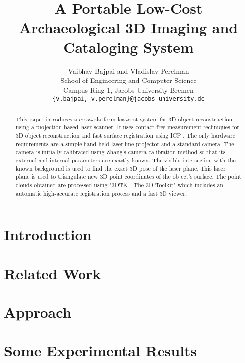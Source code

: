 \documentclass[conference]{IEEEtran}
\begin{document}
\title{A Portable Low-Cost Archaeological 3D Imaging and Cataloging System}

\author{
  Vaibhav Bajpai and Vladislav Perelman \\
  School of Engineering and Computer Science\\
  Campus Ring 1, Jacobs University Bremen\\
  \texttt{\{v.bajpai, v.perelman\}@jacobs-university.de}
}

\maketitle

\begin{abstract}
  This paper introduces a cross-platform low-cost system for 3D
  object reconstruction using a projection-based laser scanner. It uses
  contact-free measurement techniques for 3D object reconstruction and fast
  surface registration using \ac{ICP} \cite{besl:1992}. The only hardware
  requirements are a simple hand-held laser line projector and a standard
  camera. The camera is initially calibrated using Zhang's camera calibration
  method so that its external and internal parameters are exactly known. The
  visible intersection with the known background is used to find the exact 3D
  pose of the laser plane. This laser plane is used to triangulate new 3D
  point coordinates of the object's surface. The point clouds obtained are
  processed using "3DTK - The 3D Toolkit" \cite{3dtk:2012} which includes an
  automatic high-accurate registration process and a fast 3D viewer.
\end{abstract}

\section{Introduction}
\label{section:introduction}


\section{Related Work}
\label{section:relatedwork}


\section{Approach}
\label{section:approach}


\section{Some Experimental Results}
\label{section:results}

\end{document}
